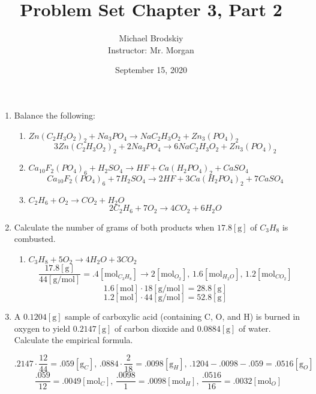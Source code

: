 \documentclass[12pt]{article}
\title{Problem Set Chapter 3, Part 2}
\date{September 15, 2020}
\author{Michael Brodskiy\\ \small Instructor: Mr. Morgan}
\begin{document}
\maketitle

\begin{enumerate}

  \item Balance the following:

    \begin{enumerate}

      \item $Zn(C_2H_3O_2)_2+Na_3PO_4\rightarrow NaC_2H_3O_2 + Zn_3(PO_4)_2$
       $$3Zn(C_2H_3O_2)_2+2Na_3PO_4\rightarrow 6NaC_2H_3O_2 + Zn_3(PO_4)_2$$

     \item $Ca_{10}F_2(PO_4)_6+H_2SO_4\rightarrow HF+Ca(H_2PO_4)_2+CaSO_4$
      $$Ca_{10}F_2(PO_4)_6+7H_2SO_4\rightarrow 2HF+3Ca(H_2PO_4)_2+7CaSO_4$$

     \item $C_2H_6+O_2\rightarrow CO_2+H_2O$
      $$2C_2H_6+7O_2\rightarrow 4CO_2+6H_2O$$


    \end{enumerate}

  \item Calculate the number of grams of both products when $17.8[\si{\gram}]$ of $C_3H_8$ is combusted.

    \begin{enumerate}

      \item $C_3H_8+5O_2\rightarrow 4H_2O+3CO_2$ 
        $$\frac{17.8[\si{\gram}]}{44[\si{\gram\per\mole}]}=.4[\si{\mole}_{C_3H_8}]\rightarrow 2[\si{\mole}_{O_2}],\,1.6[\si{\mole}_{H_2O}],\,1.2[\si{\mole}_{CO_2}]$$
        $$1.6[\si{\mole}]\cdot18[\si{\gram\per\mole}]=28.8[\si{\gram}]$$
        $$1.2[\si{\mole}]\cdot44[\si{\gram\per\mole}]=52.8[\si{\gram}]$$

    \end{enumerate}

  \item A $0.1204[\si{\gram}]$ sample of carboxylic acid (containing C, O, and H) is burned in oxygen to yield $0.2147[\si{\gram}]$ of carbon dioxide and $0.0884[\si{\gram}]$ of water. Calculate the empirical formula.

    $$.2147\cdot\frac{12}{44}=.059[\si{\gram}_C],\,.0884\cdot\frac{2}{18}=.0098[\si{\gram}_H],\,.1204-.0098-.059=.0516[\si{\gram}_O]$$
    $$\frac{.059}{12}=.0049[\si{\mole}_C],\,\frac{.0098}{1}=.0098[\si{\mole}_H],\,\frac{.0516}{16}=.0032[\si{\mole}_O]$$


\end{enumerate}
\end{document}
